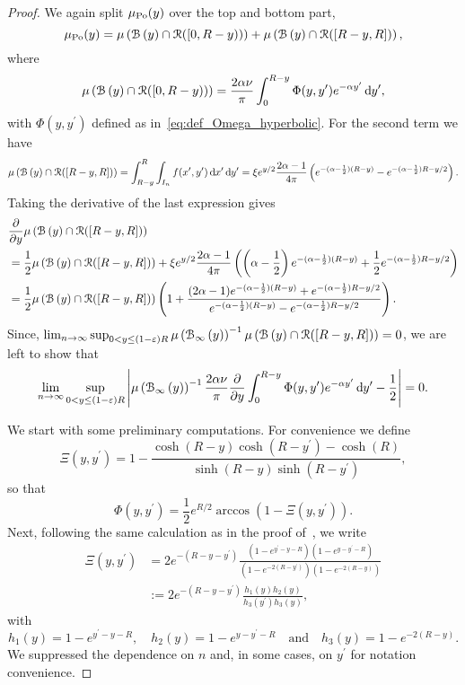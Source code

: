 \begin{appendices}
\begin{proof}
We again split $\mu_{{\mathrm{Po}}}(y)$ over the top and bottom part,
\[
	\mu_{{\mathrm{Po}}}(y) 
	= \mu\left({\mathcal B}\left(y\right) \cap {\mathcal R} ([0,R - y))\right) + \mu\left({\mathcal B}\left(y\right) \cap {\mathcal R} ([R - y, R])\right),
\]
where
\[
	\mu\left({\mathcal B}\left(y\right) \cap {\mathcal R} ([0,R - y))\right) = \frac{2\alpha \nu}{\pi}\int_0^{R - y} \Phi(y,y^\prime) 
		e^{-\alpha y^\prime} \operatorname{\mathrm{d}\hspace{-2pt}} y^\prime,
\]
with $\Phi(y,y^\prime)$ defined as in~\eqref{eq:def_Omega_hyperbolic}. For the second term we have
\[
	\mu\left({\mathcal B}\left(y\right) \cap {\mathcal R} ([R - y, R])\right)
	= \int_{R-y}^R \int_{I_n} f(x^\prime,y^\prime) \operatorname{\mathrm{d}\hspace{-2pt}} x^\prime \operatorname{\mathrm{d}\hspace{-2pt}} y^\prime
	= \xi e^{y/2}\frac{2\alpha - 1}{4\pi} \left( e^{-(\alpha - \frac{1}{2})(R - y)}
	- e^{-(\alpha - \frac{1}{2})R - y/2}\right).
\]
Taking the derivative of the last expression gives
\begin{align*}
	&\frac{\partial}{\partial y} \mu\left({\mathcal B}\left(y\right) \cap {\mathcal R} ([R - y, R])\right)\\
	&= \frac{1}{2}\mu\left({\mathcal B}\left(y\right) \cap {\mathcal R} ([R - y, R])\right)
		+ \xi e^{y/2}\frac{2\alpha - 1}{4\pi}\left(
		\left(\alpha - \frac{1}{2}\right)e^{-(\alpha - \frac{1}{2})(R - y)} 
		+ \frac{1}{2}e^{-(\alpha - \frac{1}{2})R - y/2}\right)\\
	&= \frac{1}{2}\mu\left({\mathcal B}\left(y\right) \cap {\mathcal R} ([R - y, R])\right)\left(1 +
		\frac{(2\alpha - 1)e^{-(\alpha - \frac{1}{2})(R - y)} + e^{-(\alpha - \frac{1}{2})R - y/2}}
		{e^{-(\alpha - \frac{1}{2})(R - y)} - e^{-(\alpha - \frac{1}{2})R - y/2}}\right).
\end{align*}
Since, $\lim_{n \to \infty} \sup_{0 < y \le (1-\varepsilon)R} \mu\left({\mathcal B}_{\infty}\left(y\right)\right)^{-1} \mu\left({\mathcal B}\left(y\right) \cap {\mathcal R} ([R - y, R])\right) = 0$, we are left to show that
\begin{equation}\label{eq:derivative_mu_hyp_ball_main}
	\lim_{n \to \infty} \sup_{0 < y \le (1-\varepsilon)R} \left|\mu\left({\mathcal B}_{\infty}\left(y\right)\right)^{-1} \frac{2\alpha \nu}{\pi} \frac{\partial}{\partial y} \int_0^{R - y} \Phi(y,y^\prime) e^{-\alpha y^\prime} \operatorname{\mathrm{d}\hspace{-2pt}} y^\prime
	- \frac{1}{2}\right| = 0.
\end{equation}

We start with some preliminary computations. For convenience we define
\[
	\Xi(y,y^\prime) = 1 - \frac{\cosh(R- y)\cosh(R-y^\prime) - \cosh(R)}{\sinh(R - y) \sinh(R - y^\prime)},
\]
so that
\[
	\Phi(y, y^\prime) = \frac{1}{2}e^{R/2} \arccos\left(1 - \Xi(y,y^\prime)\right).
\]
Next, following the same calculation as in the proof of~\cite[Lemma 28]{fountoulakis2018law}, we write
\begin{align*}
	\Xi(y,y^\prime)
	&= 2 e^{-(R - y - y^\prime)} \frac{\left(1 - e^{y^\prime - y - R}\right)\left(1 - e^{y - y^\prime - R}\right)}
		{\left(1 - e^{-2(R - y^\prime)}\right)\left(1 - e^{-2(R- y)}\right)}\\
	&:= 2 e^{-(R - y - y^\prime)} \frac{h_1(y) h_2(y)}{h_3(y^\prime) h_3(y)},
\end{align*}
with
\[
	h_1(y) = 1 - e^{y^\prime - y - R}, \quad h_2(y) = 1 - e^{y - y^\prime - R}
	\quad \text{and} \quad h_3(y) = 1 - e^{-2(R- y)}.
\]
We suppressed the dependence on $n$ and, in some cases, on $y^\prime$ for notation convenience.


\end{proof}
\end{appendices}
